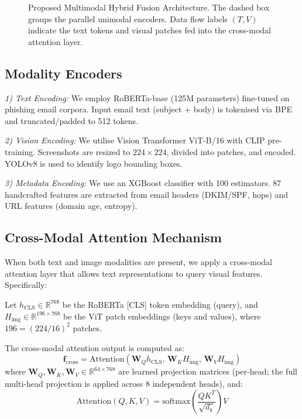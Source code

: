 \documentclass[conference]{IEEEtran}
\begin{document}
\begin{figure}[t]
    \centering
    \caption{Proposed Multimodal Hybrid Fusion Architecture. The dashed box groups the parallel unimodal encoders. Data flow labels $(T, V)$ indicate the text tokens and visual patches fed into the cross-modal attention layer.}
    \label{fig:architecture}
\end{figure}

\subsection{Modality Encoders}

\textit{1) Text Encoding:} We employ RoBERTa-base (125M parameters) fine-tuned on phishing email corpora. Input email text (subject + body) is tokenised via BPE and truncated/padded to 512 tokens.

\textit{2) Vision Encoding:} We utilise Vision Transformer ViT-B/16 with CLIP pre-training. Screenshots are resized to $224 \times 224$, divided into patches, and encoded. YOLOv8 is used to identify logo bounding boxes.

\textit{3) Metadata Encoding:} We use an XGBoost classifier with 100 estimators. 87 handcrafted features are extracted from email headers (DKIM/SPF, hops) and URL features (domain age, entropy).

\subsection{Cross-Modal Attention Mechanism}

When both text and image modalities are present, we apply a cross-modal attention layer that allows text representations to query visual features. Specifically:

Let $h_{\text{CLS}} \in \mathbb{R}^{768}$ be the RoBERTa [CLS] token embedding (query), and $H_{\text{img}} \in \mathbb{R}^{196 \times 768}$ be the ViT patch embeddings (keys and values), where $196 = (224/16)^2$ patches.

The cross-modal attention output is computed as:
\begin{equation}
    \mathbf{f}_{\text{cross}} = \text{Attention}(\mathbf{W}_Q h_{\text{CLS}},\, \mathbf{W}_K H_{\text{img}},\, \mathbf{W}_V H_{\text{img}})
\end{equation}
where $\mathbf{W}_Q, \mathbf{W}_K, \mathbf{W}_V \in \mathbb{R}^{64 \times 768}$ are learned projection matrices (per-head; the full multi-head projection is applied across 8 independent heads), and:
\begin{equation}
    \text{Attention}(Q, K, V) = \text{softmax}\!\left(\frac{QK^T}{\sqrt{d_k}}\right) V
\end{equation}
\end{document}

